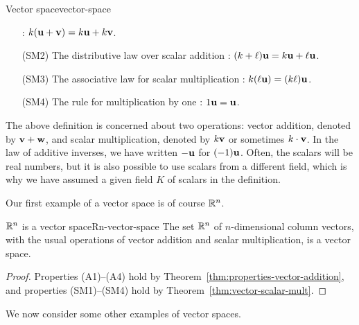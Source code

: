 \begin{definition}{Vector space}{vector-space}
\begin{itemize}
    :
    $k(\mbox{\bf u} + \mbox{\bf v}) = k\mbox{\bf u} + k\mbox{\bf v}$.
  \item[(SM2)] The distributive law over scalar addition%
    :
    $(k + \ell) \mbox{\bf u} = k \mbox{\bf u} + \ell\mbox{\bf u}$.
  \item[(SM3)] The associative law for scalar multiplication%
    :
    $k(\ell\mbox{\bf u}) = (k \ell)\mbox{\bf u}$.
  \item[(SM4)] The rule for multiplication by one%
    :
    $1\mbox{\bf u}=\mbox{\bf u}$.
  \end{itemize}
\end{definition}

The above definition is concerned about two operations: vector
addition, denoted by $\mbox{\bf v} + \mbox{\bf w}$, and scalar multiplication,
denoted by $k\mbox{\bf v}$ or sometimes $k\cdot\mbox{\bf v}$. In the law of
additive inverses, we have written $-\mbox{\bf u}$ for $(-1)\mbox{\bf u}$. Often, the
scalars will be real numbers, but it is also possible to use scalars
from a different field, which is why we have assumed a given field $K$
of scalars in the definition.

Our first example of a vector space is of course $\mathbb{R}^n$.

\begin{proposition}{$\mathbb{R}^n$ is a vector space}{Rn-vector-space}
  The set $\mathbb{R}^n$ of $n$-dimensional column vectors, with the usual
  operations of vector addition and scalar multiplication, is a vector
  space.
\end{proposition}

\begin{proof}
  Properties (A1)--(A4) hold by
  Theorem~\ref{thm:properties-vector-addition}, and properties
  (SM1)--(SM4) hold by Theorem~\ref{thm:vector-scalar-mult}.
\end{proof}

We now consider some other examples of vector spaces.

